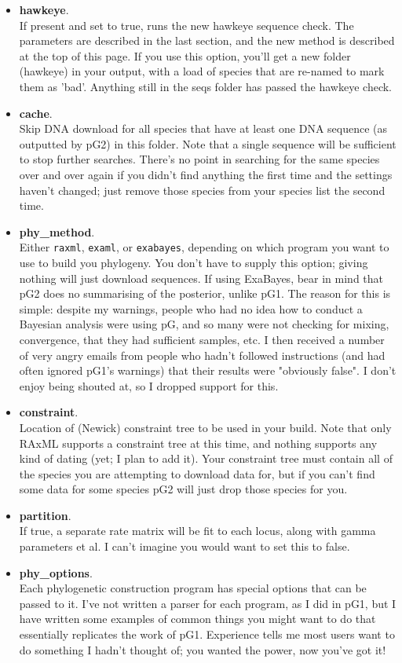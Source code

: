 \documentclass[12pt]{article}
\begin{document}
\begin{itemize}
  \item \textbf{hawkeye}.\\If present and set to true, runs the new hawkeye
  sequence check. The parameters are described in the last section,
  and the new method is described at the top of this page. If you use
  this option, you'll get a new folder (hawkeye) in your output, with
  a load of species that are re-named to mark them as 'bad'. Anything
  still in the seqs folder has passed the hawkeye check.
\item \textbf{cache}.\\Skip DNA download for all species that have at
  least one DNA sequence (as outputted by pG2) in this folder. Note
  that a single sequence will be sufficient to stop further
  searches. There's no point in searching for the same species over
  and over again if you didn't find anything the first time and the
  settings haven't changed; just remove those species from your
  species list the second time.
\item \textbf{phy\_method}.\\Either \texttt{raxml}, \texttt{examl}, or
  \texttt{exabayes}, depending on which program you want to use to
  build you phylogeny. You don't have to supply this option; giving
  nothing will just download sequences.  If using ExaBayes, bear in
  mind that pG2 does no summarising of the posterior, unlike pG1. The
  reason for this is simple: despite my warnings, people who had no
  idea how to conduct a Bayesian analysis were using pG, and so many
  were not checking for mixing, convergence, that they had sufficient
  samples, etc. I then received a number of very angry emails from
  people who hadn't followed instructions (and had often ignored pG1's
  warnings) that their results were "obviously false". I don't enjoy
  being shouted at, so I dropped support for this.
\item \textbf{constraint}.\\ Location of (Newick) constraint tree to be
  used in your build. Note that only RAxML supports a constraint tree
  at this time, and nothing supports any kind of dating (yet; I plan
  to add it). Your constraint tree must contain all of the species you
  are attempting to download data for, but if you can't find some data
  for some species pG2 will just drop those species for you.
\item \textbf{partition}.\\ If true, a separate rate matrix will be fit
  to each locus, along with gamma parameters et al. I can't imagine
  you would want to set this to false.
\item \textbf{phy\_options}. \\Each phylogenetic construction program
  has special options that can be passed to it. I've not written a
  parser for each program, as I did in pG1, but I have written some
  examples of common things you might want to do that essentially
  replicates the work of pG1. Experience tells me most users want to
  do something I hadn't thought of; you wanted the power, now you've
  got it!
\end{itemize}
\end{document}
